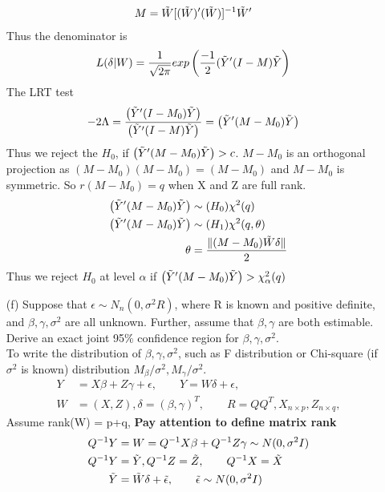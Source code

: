 \begin{itemize}
\begin{align*}
M &= \Tilde{W}[(\Tilde{W})'(\Tilde{W})]^{-1}\Tilde{W}' 
\end{align*}
Thus the denominator is 
\begin{align*}
L(\delta|W) &= \frac{1}{\sqrt{2\pi}} exp \left(\frac{-1}{2} (\Tilde{Y}' (I- M) \Tilde{Y} \right)
\end{align*}
The LRT test 
\begin{align*}
-2 \Lambda &= \frac{\left(\Tilde{Y}' (I- M_0) \Tilde{Y} \right)}{\left(\Tilde{Y}' (I- M) \Tilde{Y} \right)} = \left(\Tilde{Y}' (M -M_0) \Tilde{Y} \right)
\end{align*}
Thus we reject the $H_0$, if $\left(\Tilde{Y}' (M -M_0) \Tilde{Y} \right) > c$.
$M-M_0$ is an orthogonal projection as $(M-M_0)(M-M_0) = (M-M_0)$ and $M-M_0$ is symmetric. So $r(M-M_0) = q$ when X and Z are full rank.\\
\begin{align*}
\left(\Tilde{Y}' (M -M_0) \Tilde{Y} \right) &\sim (H_0) \chi^2(q)\\
\left(\Tilde{Y}' (M -M_0) \Tilde{Y} \right) &\sim (H_1) \chi^2(q, \theta)\\
\theta &= \frac{\lVert (M-M_0) \Tilde{W} \delta \rVert}{2}
\end{align*}
Thus we reject $H_0$ at level $\alpha$ if $\left(\Tilde{Y}' (M -M_0) \Tilde{Y} \right) > \chi^2_{\alpha}(q)$
\item[(f)] Suppose that $\epsilon \sim N_n(0, \sigma^2 R )$, where R is known and positive definite, and
$\beta, \gamma, \sigma^2$ are all unknown. Further, assume that $\beta, \gamma$ are both estimable. Derive an exact joint 95$\%$ confidence region for $\beta, \gamma, \sigma^2$.\\
To write the distribution of $\beta, \gamma, \sigma^2$, such as F distribution or Chi-square (if $\sigma^2$ is known) distribution $M_{\beta}/ \sigma^2, M_{\gamma}/ \sigma^2$.
\begin{align*}
Y &= X\beta + Z\gamma + \epsilon, \qquad Y = W\delta + \epsilon, \\
W &= (X, Z), \delta = (\beta, \gamma)^T, \qquad R = Q Q^{T}, X_{n \times p}, Z_{n \times q}, 
\end{align*}
Assume rank(W) = p+q, \textbf{Pay attention to define matrix rank}
\begin{align*}
Q^{-1}Y &= W = Q^{-1}X \beta + Q^{-1}Z \gamma \sim N(0, \sigma^2 I)\\
Q^{-1}Y &= \Tilde{Y}, Q^{-1}Z = \Tilde{Z}, \qquad Q^{-1}X = \Tilde{X}\\
\Tilde{Y} &= \Tilde{W} \delta + \Tilde{\epsilon},  \qquad \Tilde{\epsilon} \sim N(0,\sigma^2 I)

\end{align*}
\end{itemize}
